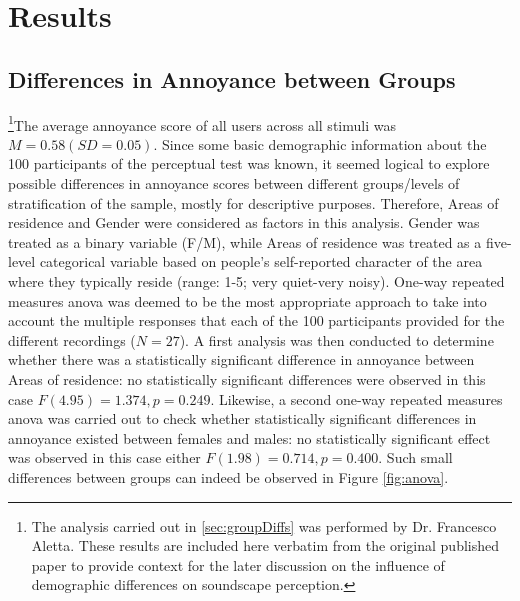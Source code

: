 
\section{Results}

\subsection{Differences in Annoyance between Groups \label{sec:groupDiffs}}

\footnote{The analysis carried out in \cref{sec:groupDiffs} was performed by Dr. Francesco Aletta. These results are included here verbatim from the original published paper to provide context for the later discussion on the influence of demographic differences on soundscape perception.}The average annoyance score of all users across all stimuli was $M=0.58 (SD=0.05)$. Since some basic demographic information about the 100 participants of the perceptual test was known, it seemed logical to explore possible differences in annoyance scores between different groups/levels of stratification of the sample, mostly for descriptive purposes. Therefore, Areas of residence and Gender were considered as factors in this analysis. Gender was treated as a binary variable (F/M), while Areas of residence was treated as a five-level categorical variable based on people's self-reported character of the area where they typically reside (range: 1-5; very quiet-very noisy). One-way repeated measures \gls{anova} was deemed to be the most appropriate approach to take into account the multiple responses that each of the 100 participants provided for the different recordings ($N=27$). A first analysis was then conducted to determine whether there was a statistically significant difference in annoyance between Areas of residence: no statistically significant differences were observed in this case $F(4.95)=1.374, p=0.249$. Likewise, a second one-way repeated measures \gls{anova} was carried out to check whether statistically significant differences in annoyance existed between females and males: no statistically significant effect was observed in this case either $F(1.98)=0.714, p=0.400$. Such small differences between groups can indeed be observed in Figure \ref{fig:anova}.

